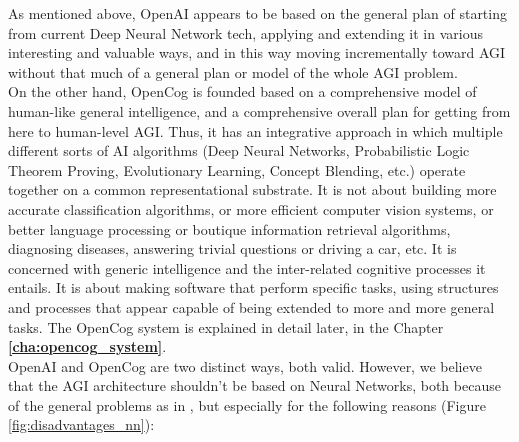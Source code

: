 As mentioned above, OpenAI appears to be based on the general plan of starting from current Deep Neural Network tech, applying and extending it in various interesting and valuable ways, and in this way moving incrementally toward AGI without that much of a general plan or model of the whole AGI problem.\\
On the other hand, OpenCog is founded based on a comprehensive model of human-like general intelligence, and a comprehensive overall plan for getting from here to human-level AGI. Thus, it has an integrative approach in which multiple different sorts of AI algorithms (Deep Neural Networks, Probabilistic Logic Theorem Proving, Evolutionary Learning, Concept Blending, etc.) operate together on a common representational substrate.
It is not about building more accurate classification algorithms, or more efficient computer vision systems, or better language processing or boutique information retrieval algorithms, diagnosing diseases, answering trivial questions or driving a car, etc. It is concerned with generic intelligence and the inter-related cognitive processes it entails. It is about making software that perform specific tasks, using structures and processes that appear capable of being extended to more and more general tasks.
The OpenCog system is explained in detail later, in the Chapter \textbf{\ref{cha:opencog_system}}. \\
OpenAI and OpenCog are two distinct ways, both valid. However, we believe that the AGI architecture shouldn't be based on Neural Networks, both because of the general problems as in \cite{323037}, but especially for the following reasons (Figure \ref{fig:disadvantages_nn}):


